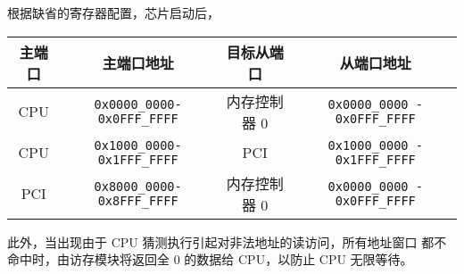 \newpage\noindent
根据缺省的寄存器配置，芯片启动后，
\begin{center}
  \begin{tabular}{|c|c|c|c|} \hline
    主端口 & 主端口地址              & 目标从端口   & 从端口地址         \\ \hline
    CPU    & \verb+0x0000_0000-0x0FFF_FFFF+ & 内存控制器 0 & \verb+0x0000_0000 - 0x0FFF_FFFF+ \\ \hline
    CPU    & \verb+0x1000_0000-0x1FFF_FFFF+ & PCI          & \verb+0x1000_0000 - 0x1FFF_FFFF+ \\ \hline
    PCI    & \verb+0x8000_0000-0x8FFF_FFFF+ & 内存控制器 0 & \verb+0x0000_0000 - 0x0FFF_FFFF+ \\ \hline
  \end{tabular}
\end{center}

此外，当出现由于 CPU 猜测执行引起对非法地址的读访问，所有地址窗口
都不命中时，由访存模块将返回全 0 的数据给 CPU，以防止 CPU 无限等待。

